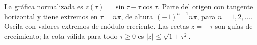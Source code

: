 La gráfica normalizada es \(z(\tau)=\sin\tau-\tau\cos\tau\). Parte del origen con tangente horizontal y tiene extremos en \(\tau=n\pi\), de altura \((-1)^{n+1}n\pi\), para \(n=1,2,\ldots\). Oscila con valores extremos de módulo creciente. Las rectas \(z=\pm\tau\) son guías de crecimiento; la cota válida para todo \(\tau\ge0\) es \(|z|\le\sqrt{1+\tau^2}\).
